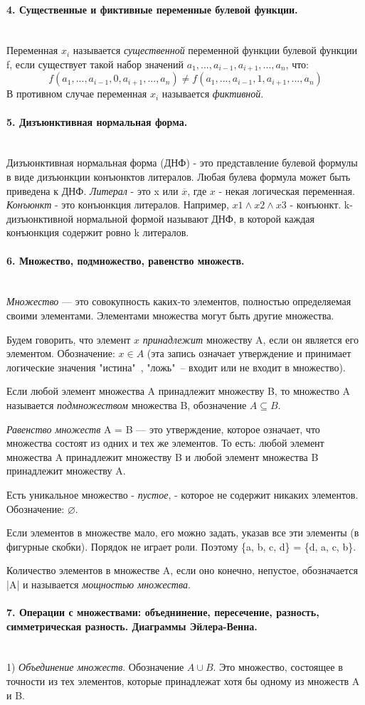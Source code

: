 \documentclass[a4paper, 12pt]{article}
\newcommand{\parag}[1]{\paragraph{#1}\mbox{}\\}
\begin{document}
\parag{4. Существенные и фиктивные переменные булевой функции.}
Переменная $x_{i}$ называется \textit{существенной} переменной функции булевой функции f, если существует такой набор значений $a_{1}, ..., a_{i-1}, a_{i + 1}, ..., a_{n}$, что:
\[
f(a_{1}, ..., a_{i-1}, 0, a_{i+1}, ..., a_{n}) \neq f(a_{1}, ..., a_{i-1}, 1, a_{i+1}, ..., a_{n})
\]
В противном случае переменная $x_{i}$ называется \textit{фиктивной}.


\parag{5. Дизъюнктивная нормальная форма.}
Дизъюнктивная нормальная форма (ДНФ) - это представление булевой формулы в виде дизъюнкции конъюнктов литералов. Любая булева формула может быть приведена к ДНФ. \textit{Литерал} - это x или $\overline{x}$, где $x$ - некая логическая переменная. \textit{Конъюнкт} - это конъюнкция литералов. Например, $x1 \land x2 \land x3$ - конъюнкт. k-дизъюнктивной нормальной формой называют ДНФ, в которой каждая конъюнкция содержит ровно k литералов.

\parag{6. Множество, подмножество, равенство множеств.}
\textit{Множество} — это совокупность каких-то элементов, полностью определяемая своими элементами. Элементами множества могут быть другие множества.

\noindent
Будем говорить, что элемент $x$ \textit{принадлежит} множеству A, если он является его элементом. Обозначение: $x \in A$ (эта запись означает утверждение и принимает логические значения "истина"\ , "ложь"\ – входит или не входит в множество). 

\noindent
Если любой элемент множества A принадлежит множеству B, то множество A называется \textit{подмножеством} множества B, обозначение $A \subseteq B$.

\noindent
\textit{Равенство множеств} A = B — это утверждение, которое означает, что множества состоят из одних и тех же элементов. То есть: любой элемент множества A принадлежит множеству B и любой элемент множества B принадлежит множеству A.

\noindent
Есть уникальное множество - \textit{пустое}, - которое не содержит никаких элементов. Обозначение: $\varnothing$. 

\noindent
Если элементов в множестве мало, его можно задать, указав все эти элементы (в фигурные скобки). Порядок не играет роли. Поэтому \{a, b, c, d\} = \{d, a, c, b\}. 

\noindent
Количество элементов в множестве A, если оно конечно, непустое, обозначается |A| и называется \textit{мощностью множества}.


\parag{7. Операции с множествами: объеднинение, пересечение, разность, симметрическая разность. Диаграммы Эйлера-Венна.}
1) \textit{Объединение множеств}. Обозначение $A \cup B$. Это множество, состоящее в точности из тех элементов, которые принадлежат хотя бы одному из множеств A и B.
\end{document}
